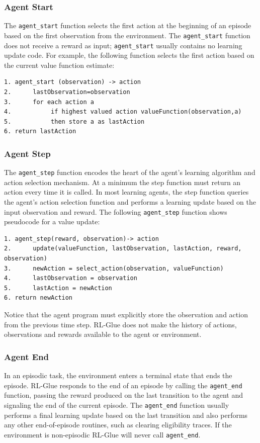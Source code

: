 \documentclass[11pt]{article}
\begin{document}
\subsubsection{Agent Start}
The \texttt{agent\_start} function selects the first action at the beginning of an episode based on the first observation from the environment. The \texttt{agent\_start} function does not receive a reward as input; \texttt{agent\_start} usually contains no learning update code. For example, the following function selects the first action based on the current value function estimate:
\begin{verbatim}
1. agent_start (observation) -> action
2.      lastObservation=observation
3.      for each action a
4.           if highest valued action valueFunction(observation,a)
5.           then store a as lastAction
6. return lastAction
\end{verbatim}

\subsubsection{Agent Step}
The \texttt{agent\_step} function encodes the heart of the agent's learning algorithm and action selection mechanism. At a minimum the step function must return an action every time it is called. In most learning agents, the step function queries the agent's action selection function and performs a learning update based on the input observation and reward. The following \texttt{agent\_step} function shows pseudocode for a value update:
\begin{verbatim}
1. agent_step(reward, observation)-> action
2.      update(valueFunction, lastObservation, lastAction, reward, observation)
3.      newAction = select_action(observation, valueFunction)
4.      lastObservation = observation
5.      lastAction = newAction
6. return newAction
\end{verbatim}  
Notice that the agent program must explicitly store the observation and action from the previous time step. RL-Glue does not make the history of actions, observations and rewards available to the agent or environment.

\subsubsection{Agent End}
In an episodic task, the environment enters a terminal state that ends the episode. RL-Glue responds to the end of an episode by calling the \texttt{agent\_end} function, passing the reward produced on the last transition to the agent and signaling the end of the current episode. The \texttt{agent\_end} function usually performs a final learning update based on the last transition and also performs any other end-of-episode routines, such as clearing eligibility traces. If the environment is non-episodic RL-Glue will never call \texttt{agent\_end}.
\end{document}
